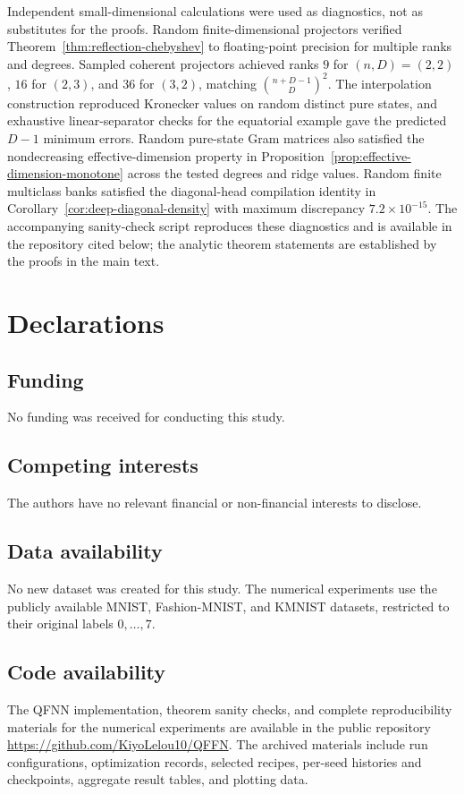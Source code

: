 \documentclass[pdflatex,sn-mathphys,NameDate,iicol]{sn-jnl}
\begin{document}
Independent small-dimensional calculations were used as diagnostics, not as
substitutes for the proofs. Random finite-dimensional projectors verified
Theorem~\ref{thm:reflection-chebyshev} to floating-point precision for
multiple ranks and degrees. Sampled coherent projectors achieved ranks
$9$ for $(n,D)=(2,2)$, $16$ for $(2,3)$, and $36$ for $(3,2)$, matching
$\binom{n+D-1}{D}^2$. The interpolation construction reproduced Kronecker
values on random distinct pure states, and exhaustive linear-separator checks
for the equatorial example gave the predicted $D-1$ minimum errors. Random
pure-state Gram matrices also satisfied the nondecreasing effective-dimension
property in Proposition~\ref{prop:effective-dimension-monotone} across the
tested degrees and ridge values. Random finite multiclass banks satisfied the
diagonal-head compilation identity in
Corollary~\ref{cor:deep-diagonal-density} with maximum discrepancy
$7.2\times10^{-15}$. The accompanying sanity-check script reproduces these
diagnostics and is available in the repository cited below; the analytic
theorem statements are established by the proofs in the main text.

\section*{Declarations}

\subsection*{Funding}
No funding was received for conducting this study.

\subsection*{Competing interests}
The authors have no relevant financial or non-financial interests to disclose.

\subsection*{Data availability}
No new dataset was created for this study. The numerical experiments use the
publicly available MNIST, Fashion-MNIST, and KMNIST datasets, restricted to
their original labels $0,\ldots,7$.

\subsection*{Code availability}
The QFNN implementation, theorem sanity checks, and complete reproducibility
materials for the numerical experiments are available in the public repository
\url{https://github.com/KiyoLelou10/QFFN}. The archived materials include run configurations, optimization
records, selected recipes, per-seed histories and checkpoints, aggregate
result tables, and plotting data.
\end{document}
